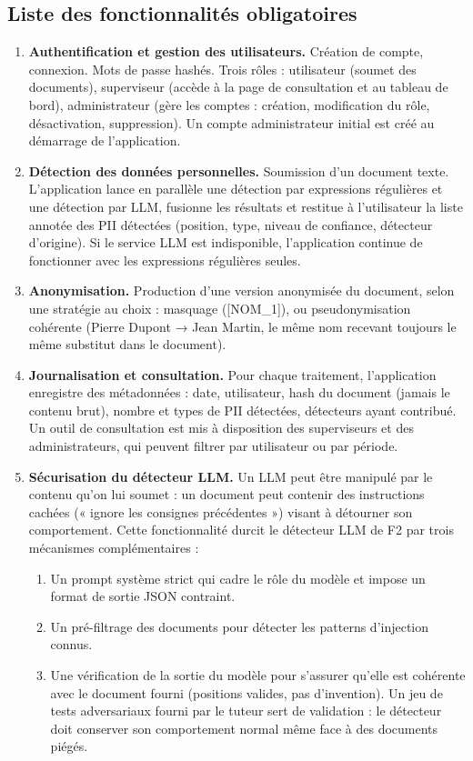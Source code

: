 \documentclass[12pt,a4paper]{article}
\begin{document}
\subsection{Liste des fonctionnalités obligatoires}
\renewcommand{\labelenumi}{F\arabic{enumi}.}
\begin{enumerate}
\item \textbf{Authentification et gestion des utilisateurs.} Création de compte, connexion. Mots de passe hashés. Trois rôles : utilisateur (soumet des documents), superviseur (accède à la page de consultation et au tableau de bord), administrateur (gère les comptes : création, modification du rôle, désactivation, suppression). Un compte administrateur initial est créé au démarrage de l’application.
\item \textbf{Détection des données personnelles.} Soumission d’un document texte. L’application lance en parallèle une détection par expressions régulières et une détection par LLM, fusionne les résultats et restitue à l’utilisateur la liste annotée des PII détectées (position, type, niveau de confiance, détecteur d’origine). Si le service LLM est indisponible, l’application continue de fonctionner avec les expressions régulières seules.
\item \textbf{Anonymisation.} Production d’une version anonymisée du document, selon une stratégie au choix : masquage ([NOM\_1]), ou pseudonymisation cohérente (Pierre Dupont → Jean Martin, le même nom recevant toujours le même substitut dans le document).
\item \textbf{Journalisation et consultation.} Pour chaque traitement, l’application enregistre des métadonnées : date, utilisateur, hash du document (jamais le contenu brut), nombre et types de PII détectées, détecteurs ayant contribué. Un outil de consultation est mis à disposition des superviseurs et des administrateurs, qui peuvent filtrer par utilisateur ou par période.
\item \textbf{Sécurisation du détecteur LLM.} Un LLM peut être manipulé par le contenu qu’on lui soumet : un document peut contenir des instructions cachées (« ignore les consignes précédentes ») visant à détourner son comportement. Cette fonctionnalité durcit le détecteur LLM de F2 par trois mécanismes complémentaires :
\begin{enumerate}
  \item Un prompt système strict qui cadre le rôle du modèle et impose un format de sortie JSON contraint.
  \item Un pré-filtrage des documents pour détecter les patterns d’injection connus.
  \item Une vérification de la sortie du modèle pour s’assurer qu’elle est cohérente avec le document fourni (positions valides, pas d’invention). Un jeu de tests adversariaux fourni par le tuteur sert de validation : le détecteur doit conserver son comportement normal même face à des documents piégés.
\end{enumerate}
\end{enumerate}
\end{document}
